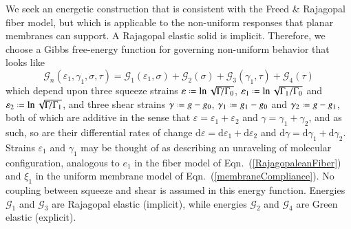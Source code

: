 We seek an energetic construction that is consistent with the Freed \& Rajagopal \cite{FreedRajagopal16} fiber model, but which is applicable to the non-uniform responses that planar membranes can support.  A Rajagopal elastic solid is implicit. Therefore, we choose a Gibbs free-energy function for governing non-uniform behavior that looks like
\begin{equation}
\mathcal{G}_n ( \varepsilon_1 , \gamma_1 , \sigma , \tau ) = \mathcal{G}_1 ( \varepsilon_1 , \sigma ) + \mathcal{G}_2 ( \sigma ) + \mathcal{G}_3 ( \gamma_1 , \tau ) + \mathcal{G}_4 ( \tau )
\label{nonuniformEnergy}
\end{equation}
which depend upon three squeeze strains $\varepsilon \defeq \ln \sqrt{\Gamma \! / \Gamma_0}$, $\varepsilon_1 \defeq \ln \sqrt{ \Gamma_1 / \Gamma_0}$ and $\varepsilon_2 \defeq \ln \sqrt{ \Gamma \! / \Gamma_1}$, and three shear strains $\gamma \defeq g - g_0$, $\gamma_1 \defeq g_1 - g_0$ and $\gamma_2 \defeq g - g_1$, both of which are additive in the sense that $\varepsilon = \varepsilon_1 + \varepsilon_2$ and $\gamma = \gamma_1 + \gamma_2$, and as such, so are their differential rates of change $\mathrm{d} \varepsilon = \mathrm{d} \varepsilon_1 + \mathrm{d} \varepsilon_2$ and $\mathrm{d} \gamma = \mathrm{d} \gamma_1 + \mathrm{d} \gamma_2$.  Strains $\varepsilon_1$ and $\gamma_1$ may be thought of as describing an unraveling of molecular configuration, analogous to $e_1$ in the fiber model of Eqn.~(\ref{RajagopaleanFiber}) and $\xi_1$ in the uniform membrane model of Eqn.~(\ref{membraneCompliance}).  No coupling between squeeze and shear is assumed in this energy function.  Energies $\mathcal{G}_1$ and $\mathcal{G}_3$ are Rajagopal elastic (implicit), while energies $\mathcal{G}_2$ and $\mathcal{G}_4$ are Green elastic (explicit).

